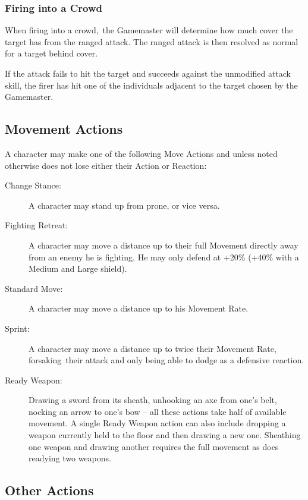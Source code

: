 \subsubsection{Firing into a Crowd}
When firing into a crowd, the Gamemaster will determine how much cover the target has from the ranged attack. The ranged attack is then resolved as normal for a target behind cover. 

If the attack fails to hit the target and succeeds against the unmodified attack skill, the firer has hit one of the individuals adjacent to the target chosen by the Gamemaster. 


\subsection{Movement Actions}
A character may make one of the following Move Actions and unless noted otherwise does not lose either their Action or Reaction:

\begin{description}
\item[Change Stance:] A character may stand up from prone, or vice versa.
\item[Fighting Retreat:] A character may move a distance up to their full Movement directly away from an enemy he is fighting. He may only defend at +20\% (+40\% with a Medium and Large shield).
\item[Standard Move:] A character may move a distance up to his Movement Rate.
\item[Sprint:] A character may move a distance up to twice their Movement Rate, forsaking their attack and only being able to dodge as a defensive reaction.
\item[Ready Weapon:] Drawing a sword from its sheath, unhooking an axe from one’s belt, nocking an arrow to one’s bow – all these actions take half of available movement. A single Ready Weapon action can also include dropping a weapon currently held to the floor and then drawing a new one. Sheathing one weapon and drawing another requires the full movement as does readying two weapons. 
\end{description}


\subsection{Other Actions}

